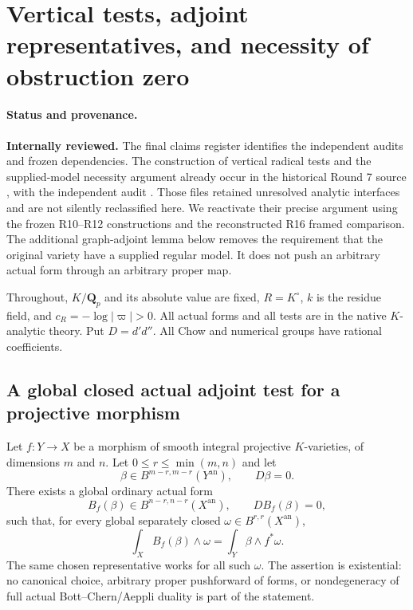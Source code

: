 \section{Vertical tests, adjoint representatives, and necessity of obstruction zero}
\label{r17vt:section}

\paragraph{Status and provenance.}
\textbf{Internally reviewed.} The final claims register identifies the independent audits and frozen dependencies.
The construction of vertical radical tests and the supplied-model
necessity argument already occur in the historical Round 7 source
, with the
independent audit
.
Those files retained unresolved analytic interfaces and are not
silently reclassified here. We reactivate their precise argument
using the frozen R10--R12 constructions and the reconstructed
R16 framed comparison. The additional graph-adjoint lemma below
removes the requirement that the original variety have a supplied
regular model. It does not push an arbitrary actual form through
an arbitrary proper map.

Throughout, $K/\mathbf Q_p$ and its absolute value are fixed,
$R=K^\circ$, $k$ is the residue field, and
$c_R=-\log|\varpi|>0$. All actual forms and all tests are in
the native $K$-analytic theory. Put $D=d'd''$.
All Chow and numerical groups have rational coefficients.

\subsection{A global closed actual adjoint test for a projective morphism}

\begin{lemma}
\label{r17vt:adjoint}
Let $f:Y\to X$ be a morphism of smooth integral projective
$K$-varieties, of dimensions $m$ and $n$. Let
$0\le r\le\min(m,n)$ and let
\[
       \beta\in B^{m-r,m-r}(Y^{\mathrm{an}}),\qquad D\beta=0.
\]
There exists a global ordinary actual form
\[
       B_f(\beta)\in B^{n-r,n-r}(X^{\mathrm{an}}),
       \qquad D B_f(\beta)=0,
       \tag{AD17.1}\label{r17vt:adjoint-output}
\]
such that, for every global separately closed
$\omega\in B^{r,r}(X^{\mathrm{an}})$,
\[
       \int_X B_f(\beta)\wedge\omega
          =\int_Y\beta\wedge f^*\omega.
       \tag{AD17.2}\label{r17vt:adjoint-pairing}
\]
The same chosen representative works for all such $\omega$.
The assertion is existential: no canonical choice, arbitrary
proper pushforward of forms, or nondegeneracy of full actual
Bott--Chern/Aeppli duality is part of the statement.
\end{lemma}

